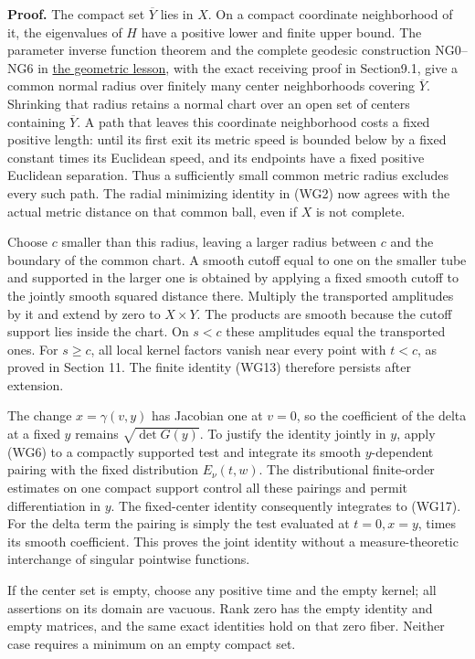 \documentclass[
  11pt,
]{article}
\begin{document}
\textbf{Proof.} The compact set \(\overline Y\) lies in \(X\). On a
compact coordinate neighborhood of it, the eigenvalues of \(H\) have a
positive lower and finite upper bound. The parameter inverse function
theorem and the complete geodesic construction NG0--NG6 in
\href{geometric-microlocal-calculus.pdf}{the geometric lesson}, with the
exact receiving proof in Section9.1, give a common normal radius over
finitely many center neighborhoods covering \(\overline Y\). Shrinking
that radius retains a normal chart over an open set of centers
containing \(\overline Y\). A path that leaves this coordinate
neighborhood costs a fixed positive length: until its first exit its
metric speed is bounded below by a fixed constant times its Euclidean
speed, and its endpoints have a fixed positive Euclidean separation.
Thus a sufficiently small common metric radius excludes every such path.
The radial minimizing identity in (WG2) now agrees with the actual
metric distance on that common ball, even if \(X\) is not complete.

Choose \(c\) smaller than this radius, leaving a larger radius between
\(c\) and the boundary of the common chart. A smooth cutoff equal to one
on the smaller tube and supported in the larger one is obtained by
applying a fixed smooth cutoff to the jointly smooth squared distance
there. Multiply the transported amplitudes by it and extend by zero to
\(X\times Y\). The products are smooth because the cutoff support lies
inside the chart. On \(s<c\) these amplitudes equal the transported
ones. For \(s\geq c\), all local kernel factors vanish near every point
with \(t<c\), as proved in Section 11. The finite identity (WG13)
therefore persists after extension.

The change \(x=\gamma(v,y)\) has Jacobian one at \(v=0\), so the
coefficient of the delta at a fixed \(y\) remains \(\sqrt{\det G(y)}\).
To justify the identity jointly in \(y\), apply (WG6) to a compactly
supported test and integrate its smooth \(y\)-dependent pairing with the
fixed distribution \(E_\nu(t,w)\). The distributional finite-order
estimates on one compact support control all these pairings and permit
differentiation in \(y\). The fixed-center identity consequently
integrates to (WG17). For the delta term the pairing is simply the test
evaluated at \(t=0,x=y\), times its smooth coefficient. This proves the
joint identity without a measure-theoretic interchange of singular
pointwise functions.

If the center set is empty, choose any positive time and the empty
kernel; all assertions on its domain are vacuous. Rank zero has the
empty identity and empty matrices, and the same exact identities hold on
that zero fiber. Neither case requires a minimum on an empty compact
set.
\end{document}

